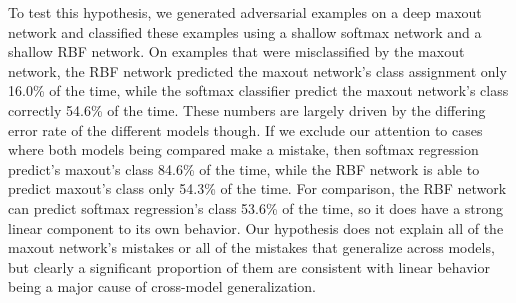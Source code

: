 \documentclass{article} %
\begin{document}
To test this hypothesis, we generated adversarial examples on a deep maxout network
and classified these examples using a shallow softmax network and a shallow RBF network.
On examples that were misclassified by the maxout network, the RBF network predicted
the maxout network's class assignment only 16.0\% of the time, while the softmax classifier
predict the maxout network's class correctly 54.6\% of the time. These numbers are largely
driven by the differing error rate of the different models though. If we exclude our
attention to cases where both models being compared make a mistake, then softmax regression
predict's maxout's class 84.6\% of the time, while the RBF network is able to predict maxout's
class only 54.3\% of the time. For comparison, the RBF network can predict softmax regression's
class 53.6\% of the time, so it does have a strong linear component to its own behavior.
Our hypothesis does not explain all of the maxout network's mistakes or all of the mistakes
that generalize across models, but clearly a significant proportion of them are consistent
with linear behavior being a major cause of cross-model generalization. 


\end{document}

